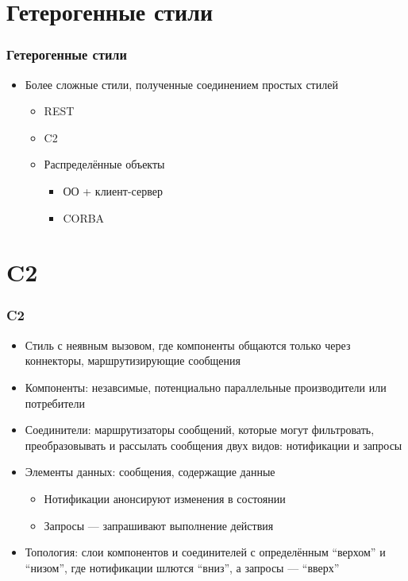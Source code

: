 \documentclass[xetex,mathserif,serif]{beamer}
\begin{document}
	\section{Гетерогенные стили}

	\begin{frame}
		\frametitle{Гетерогенные стили}
		\begin{itemize}
			\item Более сложные стили, полученные соединением простых стилей
			\begin{itemize}
				\item REST
				\item C2
				\item Распределённые объекты
				\begin{itemize}
					\item ОО + клиент-сервер
					\item CORBA
				\end{itemize}
			\end{itemize}
		\end{itemize}
	\end{frame}

	\section{C2}

	\begin{frame}
		\frametitle{C2}
		\begin{itemize}
			\item Стиль с неявным вызовом, где компоненты общаются только через коннекторы, маршрутизирующие сообщения
			\item Компоненты: незавсимые, потенциально параллельные производители или потребители
			\item Соединители: маршрутизаторы сообщений, которые могут фильтровать, преобразовывать и рассылать сообщения двух видов: нотификации и запросы
			\item Элементы данных: сообщения, содержащие данные
			\begin{itemize}
				\item Нотификации анонсируют изменения в состоянии
				\item Запросы --- запрашивают выполнение действия
			\end{itemize}
			\item Топология: слои компонентов и соединителей с определённым ``верхом'' и ``низом'', где нотификации шлются ``вниз'', а запросы --- ``вверх''
		\end{itemize}
	\end{frame}
\end{document}
